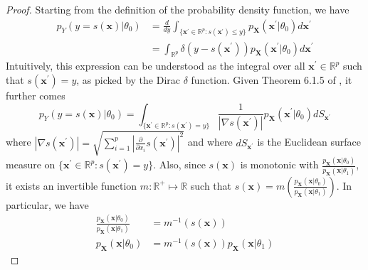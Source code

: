 \documentclass[12pt]{article}
\numberwithin{equation}{section}
\theoremstyle{plain}
\begin{document}
\begin{proof}
Starting from the definition of the probability density function, we have
\begin{align}
p_Y(y=s(\mathbf{x})|\theta_0) &= \frac{d}{dy}  \int_{\{\mathbf{x}^\prime \in \mathbb{R}^p : s(\mathbf{x}^\prime) \leq y\}} p_\mathbf{X}(\mathbf{x}^\prime|\theta_0) d\mathbf{x}^\prime \nonumber \\
&= \int_{\mathbb{R}^p} \delta(y - s(\mathbf{x}^\prime)) p_\mathbf{X}(\mathbf{x}^\prime|\theta_0) d\mathbf{x}^\prime
\end{align}
Intuitively, this expression can be understood as the integral
over all $\mathbf{x}^\prime \in \mathbb{R}^p$ such that $s(\mathbf{x}^\prime) = y$, as picked
by the Dirac $\delta$ function. Given Theorem 6.1.5 of \citet{Hrmander1990},
it further comes
\begin{equation}
p_Y(y=s(\mathbf{x})|\theta_0) = \int_{\{\mathbf{x}^\prime \in \mathbb{R}^p : s(\mathbf{x}^\prime) = y\}} \frac{1}{|\nabla s(\mathbf{x}^\prime)|} p_\mathbf{X}(\mathbf{x}^\prime|\theta_0) dS_{\mathbf{x}^\prime} \label{eqn:hormander}
\end{equation}
where $|\nabla s(\mathbf{x}^\prime)| = \sqrt{\sum_{i=1}^p |\frac{\partial}{\partial x_i} s(\mathbf{x}^\prime)|^2}$
and where $dS_{\mathbf{x}^\prime}$ is the Euclidean surface measure on $\{\mathbf{x}^\prime \in \mathbb{R}^p : s(\mathbf{x}^\prime) = y\}$.
Also, since $s(\mathbf{x})$ is monotonic with
$\frac{p_\mathbf{X}(\mathbf{x}|\theta_0)}{p_\mathbf{X}(\mathbf{x}|\theta_1)}$,
it exists an invertible function $m:\mathbb{R}^+ \mapsto \mathbb{R}$ such
that $s(\mathbf{x}) = m(\frac{p_\mathbf{X}(\mathbf{x}|\theta_0)}{p_\mathbf{X}(\mathbf{x}|\theta_1)})$.
In particular, we have
\begin{align}
\frac{p_\mathbf{X}(\mathbf{x}|\theta_0)}{p_\mathbf{X}(\mathbf{x}|\theta_1)} &= m^{-1}(s(\mathbf{x})) \nonumber \\
p_\mathbf{X}(\mathbf{x}|\theta_0) &= m^{-1}(s(\mathbf{x})) p_\mathbf{X}(\mathbf{x}|\theta_1) \label{eqn:mapping}
\end{align}

\end{proof}
\end{document}
